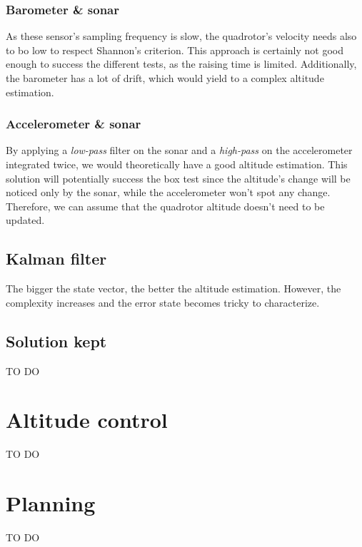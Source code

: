 \documentclass{repMobRob}
\begin{document}
\subsubsection{Barometer \& sonar}
As these sensor's sampling frequency is slow, the quadrotor's velocity needs also to bo low to respect Shannon's criterion. This approach is certainly not good enough to success the different tests, as the raising time is limited. Additionally, the barometer has a lot of drift, which would yield to a complex altitude estimation.

\subsubsection{Accelerometer \& sonar}
By applying a \emph{low-pass} filter on the sonar and a \emph{high-pass} on the accelerometer integrated twice, we would theoretically have a good altitude estimation. This solution will potentially success the box test since the altitude's change will be noticed only by the sonar, while the accelerometer won't spot any change. Therefore, we can assume that the quadrotor altitude doesn't need to be updated.

\subsection{Kalman filter}
The bigger the state vector, the better the altitude estimation. However, the complexity increases and the error state becomes tricky to characterize. 

\subsection{Solution kept}
TO DO

\section{Altitude control}
TO DO

\section{Planning}
TO DO
\end{document}

